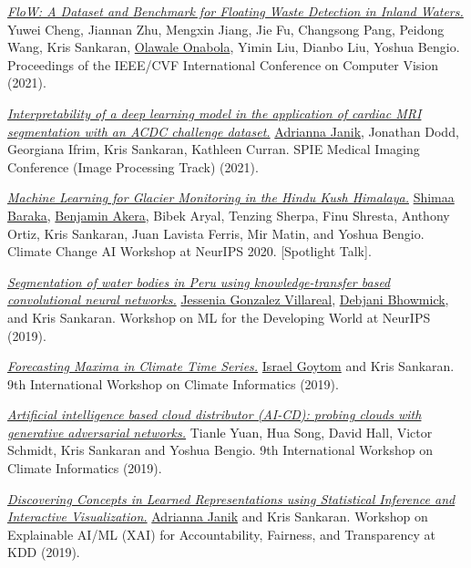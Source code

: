 \documentclass[letterpaper]{article}
\renewenvironment{itemize}{
  \begin{list}{}{
    \setlength{\leftmargin}{1.5em}
  }
}{
  \end{list}
}
\begin{document}
\begin{itemize}
  \item \href{https://openaccess.thecvf.com/content/ICCV2021/papers/Cheng_FloW_A_Dataset_and_Benchmark_for_Floating_Waste_Detection_in_ICCV_2021_paper.pdf}{\textit{FloW: A Dataset and Benchmark for Floating Waste Detection in Inland Waters.}} Yuwei Cheng, Jiannan Zhu, Mengxin Jiang, Jie Fu, Changsong Pang, Peidong Wang, Kris Sankaran, \underline{Olawale Onabola}, Yimin Liu, Dianbo Liu, Yoshua Bengio. Proceedings of the IEEE/CVF International Conference on Computer Vision (2021).  
  \item \href{https://doi.org/10.1117/12.2582227}{\textit{Interpretability of a deep learning model in the application of cardiac MRI segmentation with an ACDC challenge dataset.}} \underline{Adrianna Janik}, Jonathan Dodd, Georgiana Ifrim, Kris Sankaran, Kathleen Curran. SPIE Medical Imaging Conference (Image Processing Track) (2021).  
  \item \href{https://www.climatechange.ai/papers/neurips2020/57}{\textit{Machine Learning for Glacier Monitoring in the Hindu Kush Himalaya.}} \underline{Shimaa Baraka}, \underline{Benjamin Akera}, Bibek Aryal, Tenzing Sherpa, Finu Shresta, Anthony Ortiz, Kris Sankaran, Juan Lavista Ferris, Mir Matin, and Yoshua Bengio. Climate Change AI Workshop at NeurIPS 2020. [Spotlight Talk].  
  \item \href{https://d-nb.info/1221274341/34}{\textit{Segmentation of water bodies in Peru using knowledge-transfer based convolutional neural networks.}} \underline{Jessenia Gonzalez Villareal}, \underline{Debjani Bhowmick}, and Kris Sankaran. Workshop on ML for the Developing World at NeurIPS (2019).  
  \item \href{https://israelgoytom.com/papers/CI2019.pdf}{\textit{Forecasting Maxima in Climate Time Series.}} \underline{Israel Goytom} and Kris Sankaran. 9th International Workshop on Climate Informatics (2019).  
  \item \href{https://ui.adsabs.harvard.edu/abs/2019AGUFM.A43E..05Y/abstract}{\textit{Artificial intelligence based cloud distributor (AI-CD): probing clouds with generative adversarial networks.}} Tianle Yuan, Hua Song, David Hall, Victor Schmidt, Kris Sankaran and Yoshua Bengio. 9th International Workshop on Climate Informatics (2019).  
  \item \href{https://arxiv.org/abs/2202.04753}{\textit{Discovering Concepts in Learned Representations using Statistical Inference and Interactive Visualization.}} \underline{Adrianna Janik} and Kris Sankaran. Workshop on Explainable AI/ML (XAI) for Accountability, Fairness, and Transparency at KDD (2019).  

\end{itemize}
\end{document}
